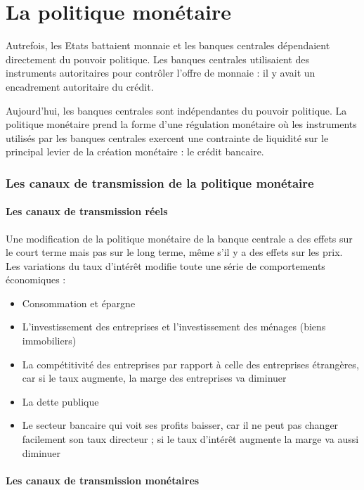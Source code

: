 \part{La politique monétaire}

Autrefois, les Etats battaient monnaie et les banques centrales dépendaient directement du pouvoir politique. Les banques centrales utilisaient des instruments autoritaires pour contrôler l'offre de monnaie : il y avait un encadrement autoritaire du crédit.

Aujourd'hui, les banques centrales sont indépendantes du pouvoir politique. La politique monétaire prend la forme d'une régulation monétaire où les instruments utilisés par les banques centrales exercent une contrainte de liquidité sur le principal levier de la création monétaire : le crédit bancaire.

\section{Les canaux de transmission de la politique monétaire}

	\subsection{Les canaux de transmission réels}

Une modification de la politique monétaire de la banque centrale a des effets sur le court terme mais pas sur le long terme, même s'il y a des effets sur les prix.  Les variations du taux d'intérêt modifie toute une série de comportements économiques :

\begin{itemize}
	\item Consommation et épargne
	\item L'investissement des entreprises et l'investissement des ménages (biens immobiliers)
	\item La compétitivité des entreprises par rapport à celle des entreprises étrangères, car si le taux augmente, la marge des entreprises va diminuer
	\item La dette publique
	\item Le secteur bancaire qui voit ses profits baisser, car il ne peut pas changer facilement son taux directeur ; si le taux d'intérêt augmente la marge va aussi diminuer
\end{itemize}

	\subsection{Les canaux de transmission monétaires}
	
